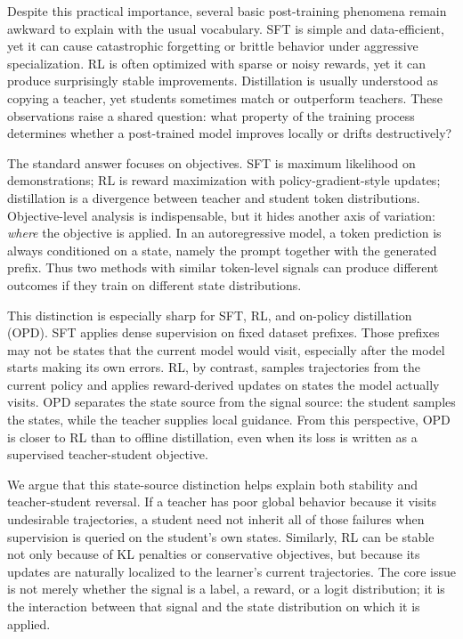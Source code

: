 \documentclass{article}
\begin{document}
Despite this practical importance, several basic post-training phenomena remain
awkward to explain with the usual vocabulary. SFT is simple and data-efficient,
yet it can cause catastrophic forgetting or brittle behavior under aggressive
specialization. RL is often optimized with sparse or noisy rewards, yet it can
produce surprisingly stable improvements. Distillation is usually understood as
copying a teacher, yet students sometimes match or outperform teachers. These
observations raise a shared question: what property of the training process
determines whether a post-trained model improves locally or drifts destructively?

The standard answer focuses on objectives. SFT is maximum likelihood on
demonstrations; RL is reward maximization with policy-gradient-style updates;
distillation is a divergence between teacher and student token distributions.
Objective-level analysis is indispensable, but it hides another axis of
variation: \emph{where} the objective is applied. In an autoregressive model, a
token prediction is always conditioned on a state, namely the prompt together
with the generated prefix. Thus two methods with similar token-level signals can
produce different outcomes if they train on different state distributions.

This distinction is especially sharp for SFT, RL, and on-policy distillation
(OPD). SFT applies dense supervision on fixed dataset prefixes. Those prefixes
may not be states that the current model would visit, especially after the model
starts making its own errors. RL, by contrast, samples trajectories from the
current policy and applies reward-derived updates on states the model actually
visits. OPD separates the state source from the signal source: the student
samples the states, while the teacher supplies local guidance. From this
perspective, OPD is closer to RL than to offline distillation, even when its loss
is written as a supervised teacher-student objective.

We argue that this state-source distinction helps explain both stability and
teacher-student reversal. If a teacher has poor global behavior because it
visits undesirable trajectories, a student need not inherit all of those
failures when supervision is queried on the student's own states. Similarly, RL
can be stable not only because of KL penalties or conservative objectives, but
because its updates are naturally localized to the learner's current
trajectories. The core issue is not merely whether the signal is a label, a
reward, or a logit distribution; it is the interaction between that signal and
the state distribution on which it is applied.
\end{document}
